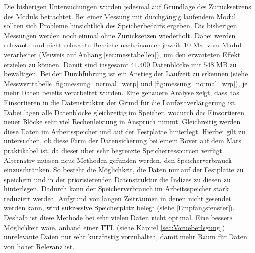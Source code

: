Die bisherigen Untersuchungen wurden jedesmal auf Grundlage des Zurücksetzens
des Moduls betrachtet. Bei einer Messung mit durchgängig laufendem Modul sollten
sich Probleme hinsichtlich des Speicherbedarfs ergeben.
\newline
Die bisherigen Messungen werden noch einmal ohne Zurücksetzen wiederholt. Dabei
werden relevante und nicht relevante Bereiche nacheinander jeweils $10$ Mal vom
Modul verarbeitet (Verweis auf Anhang \ref{sec:messtabellen}), um den
erwarteten Effekt erzielen zu können. Damit sind insgesamt $41.400$ Datenblöcke
mit $548$ MB zu bewältigen.
\newline
Bei der Durchführung ist ein Anstieg der Laufzeit zu erkennen (siehe
Messwerttabelle \ref{fig:messung_normal_worp} und \ref{fig:messung_normal_wrp}),
je mehr Daten bereits verarbeitet wurden. Eine genauere Analyse zeigt, dass das
Einsortieren in die Datenstruktur  der Grund für die
Laufzeitverlängerung ist.
Dabei lagen alle Datenblöcke gleichzeitig im Speicher, wodurch das
Einsortieren neuer Blöcke sehr viel Rechenleistung in Anspruch nimmt.
Gleichzeitig werden diese Daten im Arbeitsspeicher und auf der Festplatte
hinterlegt. Hierbei gilt zu untersuchen, ob diese Form der Datensicherung bei
einem Rover auf dem Mars praktikabel ist, da dieser über sehr begrenzte
Speicherressourcen verfügt. \newline
Alternativ müssen neue Methoden gefunden werden, den
Speicherverbrauch einzuschränken. So besteht die Möglichkeit, die Daten nur auf
der Festplatte zu speichern und in der priorisierenden Datenstruktur die Indizes
zu diesen zu hinterlegen. Dadurch kann der Speicherverbrauch im Arbeitsspeicher
stark reduziert werden. Aufgrund von langen Zeiträumen in denen nicht gesendet
werden kann, wird sukzessive Speicherplatz belegt (siehe \ref{Empfangsfenster}).
Deshalb ist diese Methode bei sehr vielen Daten nicht optimal. Eine bessere
Möglichkeit wäre, anhand einer \gls{TTL} (siehe Kapitel
\ref{sec:Vorueberlegung}) unrelevante Daten nur sehr kurzfristig vorzuhalten,
damit mehr Raum für Daten von hoher Relevanz ist.
